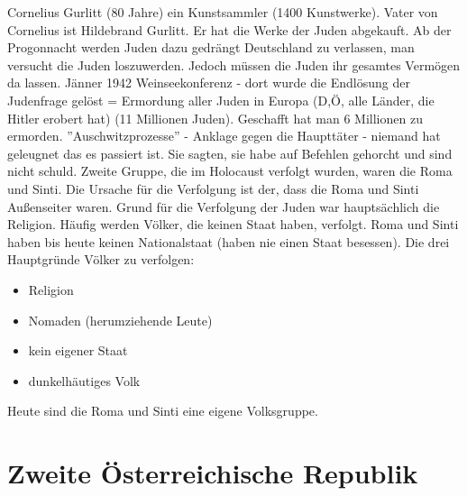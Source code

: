 \documentclass[a4paper,final]{book}
\begin{document}
\newline
\newline
Cornelius Gurlitt (80 Jahre) ein Kunstsammler (1400 Kunstwerke). Vater von Cornelius ist Hildebrand Gurlitt. Er hat die Werke der Juden abgekauft.
\newline
\newline
Ab der Progonnacht werden Juden dazu gedrängt Deutschland zu verlassen, man versucht die Juden loszuwerden. Jedoch müssen die Juden ihr gesamtes Vermögen da lassen.
\newline
\newline
Jänner 1942 Weinseekonferenz - dort wurde die Endlösung der Judenfrage gelöst = Ermordung aller Juden in Europa (D,Ö, alle Länder, die Hitler erobert hat) (11 Millionen Juden). Geschafft hat man 6 Millionen zu ermorden.
\newline
{} ''Auschwitzprozesse'' - Anklage gegen die Haupttäter - niemand hat geleugnet das es passiert ist. Sie sagten, sie habe auf Befehlen gehorcht und sind nicht schuld.
\newline
\newline
Zweite Gruppe, die im Holocaust verfolgt wurden, waren die Roma und Sinti. Die Ursache für die Verfolgung ist der, dass die Roma und Sinti Außenseiter waren. Grund für die Verfolgung der Juden war hauptsächlich die Religion. Häufig werden Völker, die keinen Staat haben, verfolgt. Roma und Sinti haben bis heute keinen Nationalstaat (haben nie einen Staat besessen).
\newline
\newline
Die drei Hauptgründe Völker zu verfolgen:
\begin{itemize}
\item Religion
\item Nomaden (herumziehende Leute)
\item kein eigener Staat
\item dunkelhäutiges Volk
\end{itemize}

Heute sind die Roma und Sinti eine eigene Volksgruppe.

\newpage

\section{Zweite Österreichische Republik}
\end{document}
